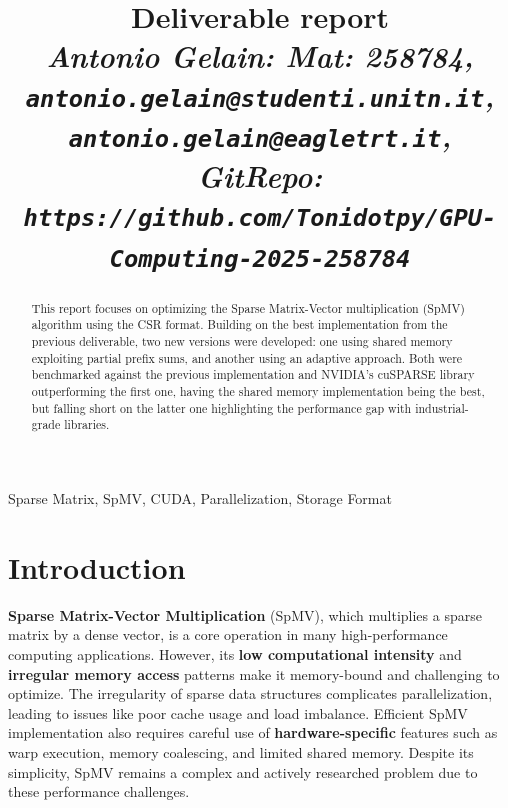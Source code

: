 \documentclass[conference]{IEEEtran}
\begin{document}
    \title{Deliverable report \\
    \footnotesize \textit{Antonio Gelain: Mat: 258784, \\
    \texttt{antonio.gelain@studenti.unitn.it}, \\
    \texttt{antonio.gelain@eagletrt.it}, \\
    GitRepo: \texttt{https://github.com/Tonidotpy/GPU-Computing-2025-258784}}}

    \maketitle

    \begin{abstract}

        This report focuses on optimizing the Sparse Matrix-Vector multiplication
        (SpMV) algorithm using the CSR format.
        Building on the best implementation from the previous deliverable, two new
        versions were developed: one using shared memory exploiting partial prefix
        sums, and another using an adaptive approach.
        Both were benchmarked against the previous implementation and NVIDIA's
        cuSPARSE library outperforming the first one, having the shared memory
        implementation being the best, but falling short on the latter one
        highlighting the performance gap with industrial-grade libraries.

    \end{abstract}

    \begin{IEEEkeywords}
        Sparse Matrix, SpMV, CUDA, Parallelization, Storage Format
    \end{IEEEkeywords}

    \section{Introduction} 

    \textbf{Sparse Matrix-Vector Multiplication} (SpMV), which multiplies a
    sparse matrix by a dense vector, is a core operation in many
    high-performance computing applications.
    However, its \textbf{low computational intensity} and \textbf{irregular
    memory access} patterns make it memory-bound and challenging to optimize.
    The irregularity of sparse data structures complicates parallelization,
    leading to issues like poor cache usage and load imbalance.
    Efficient SpMV implementation also requires careful use of
    \textbf{hardware-specific} features such as warp execution, memory
    coalescing, and limited shared memory.
    Despite its simplicity, SpMV remains a complex and actively researched
    problem due to these performance challenges.
 
\end{document}
